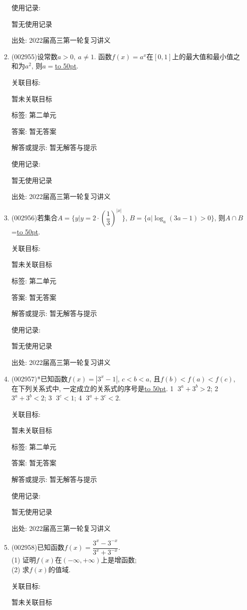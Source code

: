 \documentclass[10pt,a4paper]{article}
\newcommand{\blank}[1]{\underline{\hbox to #1pt{}}}
\begin{document}
\begin{enumerate}[1.]
使用记录:

暂无使用记录


出处: 2022届高三第一轮复习讲义
\item { (002955)}设常数$a>0,\ a\ne 1$. 函数$f(x)=a^x$在$[0,1]$上的最大值和最小值之和为$a^2$, 则$a=$\blank{50}.


关联目标:

暂未关联目标



标签: 第二单元

答案: 暂无答案

解答或提示: 暂无解答与提示

使用记录:

暂无使用记录


出处: 2022届高三第一轮复习讲义
\item { (002956)}若集合$A=\{y|y=2\cdot (\dfrac 13)^{|x|}\}$, $B=\{ a|\log_a(3a-1)>0\}$, 则$A\cap B$=\blank{50}.


关联目标:

暂未关联目标



标签: 第二单元

答案: 暂无答案

解答或提示: 暂无解答与提示

使用记录:

暂无使用记录


出处: 2022届高三第一轮复习讲义
\item { (002957)}*已知函数$f(x)=|3^x-1|$, $c<b<a$, 且$f(b)<f(a)<f(c)$, 在下列关系式中, 一定成立的关系式的序号是\blank{50}.
\textcircled{1} $3^a+3^b>2$; \textcircled{2} $3^a+3^b<2$; \textcircled{3} $3^c<1$; \textcircled{4} $3^a+3^c<2$.


关联目标:

暂未关联目标



标签: 第二单元

答案: 暂无答案

解答或提示: 暂无解答与提示

使用记录:

暂无使用记录


出处: 2022届高三第一轮复习讲义
\item { (002958)}已知函数$f(x)=\dfrac{3^x-3^{-x}}{3^x+3^{-x}}$.\\
(1) 证明$f(x)$在$(-\infty,+\infty)$上是增函数;\\
(2) 求$f(x)$的值域.


关联目标:

暂未关联目标




\end{enumerate}
\end{document}
